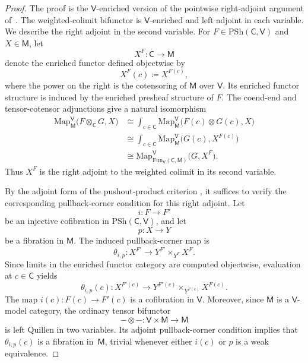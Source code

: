 \documentclass{amsart}
\newcommand{\cat}[1]{\mathsf{#1}}
\newcommand{\Fun}{\mathrm{Fun}}
\newcommand{\Map}{\mathrm{Map}}
\newcommand{\psh}{\mathrm{PSh}}
\theoremstyle{definition}
\numberwithin{equation}{subsection}
\numberwithin{subsubsection}{subsection}
\begin{document}
\begin{proof}
  The proof is the \(\cat{V}\)-enriched version of the pointwise
  right-adjoint argument of~\cite[Theorem~3.2]{Gam10}. The weighted-colimit
  bifunctor is \(\cat{V}\)-enriched and left
  adjoint in each variable. We describe the right adjoint in the second
  variable. For \(F\in\psh(\cat{C},\cat{V})\) and \(X\in\cat{M}\), let
  \[
    X^{F}:\cat{C}\longrightarrow\cat{M}
  \]
  denote the enriched functor defined objectwise by
  \[
    X^{F}(c)\coloneqq X^{F(c)},
  \]
  where the power on the right is the cotensoring of \(\cat{M}\)
  over \(\cat{V}\). Its enriched functor structure is induced by the
  enriched presheaf structure of \(F\). The coend-end and tensor-cotensor
  adjunctions give a natural isomorphism
  \[
    \begin{aligned}
      \Map_{\cat{M}}^{\cat{V}}
      \bigl(F\otimes_{\cat{C}}G,X\bigr)
      &\cong
      \int_{c\in\cat{C}}
      \Map_{\cat{M}}^{\cat{V}}
      \bigl(F(c)\otimes G(c),X\bigr) \\
      &\cong
      \int_{c\in\cat{C}}
      \Map_{\cat{M}}^{\cat{V}}
      \bigl(G(c),X^{F(c)}\bigr) \\
      &\cong
      \Map_{\Fun_{\cat{V}}(\cat{C},\cat{M})}^{\cat{V}}
      \bigl(G,X^{F}\bigr).
    \end{aligned}
  \]
  Thus \(X^{F}\) is the right adjoint to the weighted colimit in its
  second variable.

  By the adjoint form of the pushout-product criterion
  \textnormal{\cite[Lemma~4.2.2]{Hov99}}, it suffices to verify the
  corresponding pullback-corner condition for this right adjoint. Let
  \[
    i:F\longrightarrow F'
  \]
  be an injective cofibration in \(\psh(\cat{C},\cat{V})\), and let
  \[
    p:X\longrightarrow Y
  \]
  be a fibration in \(\cat{M}\). The induced pullback-corner map is
  \[
    \theta_{i,p}:
    X^{F'}
    \longrightarrow
    Y^{F'}\times_{Y^{F}}X^{F}.
  \]
  Since limits in the enriched functor category are computed objectwise,
  evaluation at \(c\in\cat{C}\) yields
  \[
    \theta_{i,p}(c):
    X^{F'(c)}
    \longrightarrow
    Y^{F'(c)}
    \times_{Y^{F(c)}}
    X^{F(c)}.
  \]
  The map \(i(c):F(c)\to F'(c)\) is a cofibration in \(\cat{V}\).
  Moreover, since \(\cat{M}\) is a \(\cat{V}\)-model category, the ordinary
  tensor bifunctor
  \[
    -\otimes-:\cat{V}\times\cat{M}\longrightarrow\cat{M}
  \]
  is left Quillen in two variables. Its adjoint pullback-corner condition
  implies that \(\theta_{i,p}(c)\) is a fibration in~\(\cat{M}\), trivial
  whenever either \(i(c)\) or \(p\) is a weak equivalence.


\end{proof}
\end{document}
